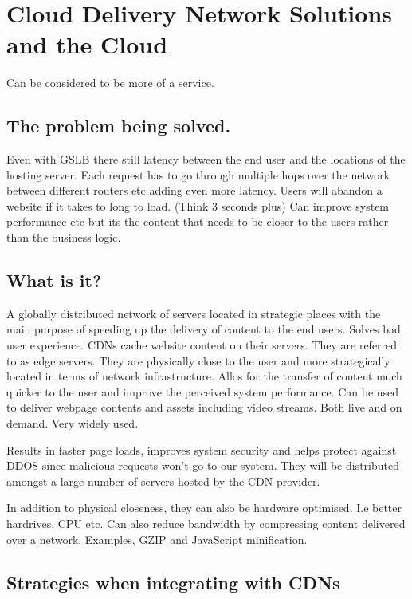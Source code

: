 \section{Cloud Delivery Network Solutions and the Cloud}
Can be considered to be more of a service.

\subsection{The problem being solved.}
Even with GSLB there still latency between the end user and the locations of the hosting server.
Each request has to go through multiple hops over the network between different routers etc adding even more latency.
Users will abandon a website if it takes to long to load. (Think 3 seconds plus)
Can improve system performance etc but its the content that needs to be closer to the users rather than the business logic.

\subsection{What is it?}
A globally distributed network of servers located in strategic places with the main purpose of speeding up the delivery of content to the end users.
Solves bad user experience.
CDNs cache website content on their servers.
They are referred to as edge servers.
They are physically close to the user and more strategically located in terms of network infrastructure.
Allos for the transfer of content much quicker to the user and improve the perceived system performance.
Can be used to deliver webpage contents and assets including video streams.
Both live and on demand.
Very widely used.

Results in faster page loads, improves system security and helps protect against DDOS since malicious requests won't go to our system.
They will be distributed amongst a large number of servers hosted by the CDN provider.

In addition to physical closeness, they can also be hardware optimised. I.e better hardrives, CPU etc.
Can also reduce bandwidth by compressing content delivered over a network.
Examples, GZIP and JavaScript minification.

\subsection{Strategies when integrating with CDNs}

